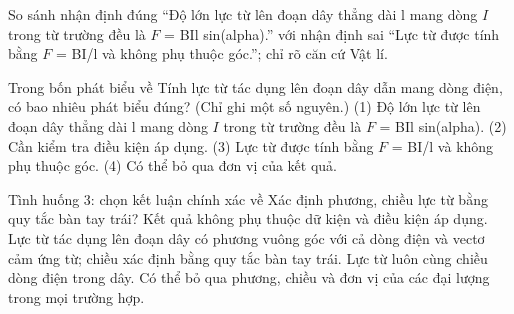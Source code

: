 \begin{bt}
So sánh nhận định đúng “Độ lớn lực từ lên đoạn dây thẳng dài l mang dòng $I$ trong từ trường đều là $F$ = BIl sin(alpha).” với nhận định sai “Lực từ được tính bằng $F$ = BI/l và không phụ thuộc góc.”; chỉ rõ căn cứ Vật lí.
\end{bt}

\begin{ex}
Trong bốn phát biểu về Tính lực từ tác dụng lên đoạn dây dẫn mang dòng điện, có bao nhiêu phát biểu đúng? (Chỉ ghi một số nguyên.) (1) Độ lớn lực từ lên đoạn dây thẳng dài l mang dòng $I$ trong từ trường đều là $F$ = BIl sin(alpha). (2) Cần kiểm tra điều kiện áp dụng. (3) Lực từ được tính bằng $F$ = BI/l và không phụ thuộc góc. (4) Có thể bỏ qua đơn vị của kết quả.
\end{ex}

\begin{ex}
Tình huống 3: chọn kết luận chính xác về Xác định phương, chiều lực từ bằng quy tắc bàn tay trái?
\choice
{Kết quả không phụ thuộc dữ kiện và điều kiện áp dụng.}
{\True Lực từ tác dụng lên đoạn dây có phương vuông góc với cả dòng điện và vectơ cảm ứng từ; chiều xác định bằng quy tắc bàn tay trái.}
{Lực từ luôn cùng chiều dòng điện trong dây.}
{Có thể bỏ qua phương, chiều và đơn vị của các đại lượng trong mọi trường hợp.}
\end{ex}


